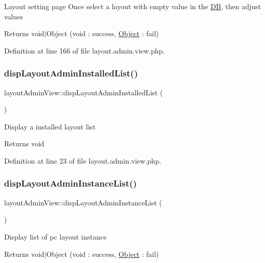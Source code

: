 Layout setting page Once select a layout with empty value in the \hyperlink{classDB}{DB}, then adjust values \begin{DoxyReturn}{Returns}
void$\vert$\+Object (void \+: success, \hyperlink{classObject}{Object} \+: fail) 
\end{DoxyReturn}


Definition at line 166 of file layout.\+admin.\+view.\+php.

\hypertarget{classlayoutAdminView_acad8194900695a9aa48ff6dca1435dd3}{}\label{classlayoutAdminView_acad8194900695a9aa48ff6dca1435dd3} 
\subsubsection{\texorpdfstring{disp\+Layout\+Admin\+Installed\+List()}{dispLayoutAdminInstalledList()}}
{\footnotesize\ttfamily layout\+Admin\+View\+::disp\+Layout\+Admin\+Installed\+List (\begin{DoxyParamCaption}{ }\end{DoxyParamCaption})}

Display a installed layout list \begin{DoxyReturn}{Returns}
void 
\end{DoxyReturn}


Definition at line 23 of file layout.\+admin.\+view.\+php.

\hypertarget{classlayoutAdminView_ab392ea5f53d762ac9da15fe6d40c1e6b}{}\label{classlayoutAdminView_ab392ea5f53d762ac9da15fe6d40c1e6b} 
\subsubsection{\texorpdfstring{disp\+Layout\+Admin\+Instance\+List()}{dispLayoutAdminInstanceList()}}
{\footnotesize\ttfamily layout\+Admin\+View\+::disp\+Layout\+Admin\+Instance\+List (\begin{DoxyParamCaption}{ }\end{DoxyParamCaption})}

Display list of pc layout instance \begin{DoxyReturn}{Returns}
void$\vert$\+Object (void \+: success, \hyperlink{classObject}{Object} \+: fail) 
\end{DoxyReturn}


